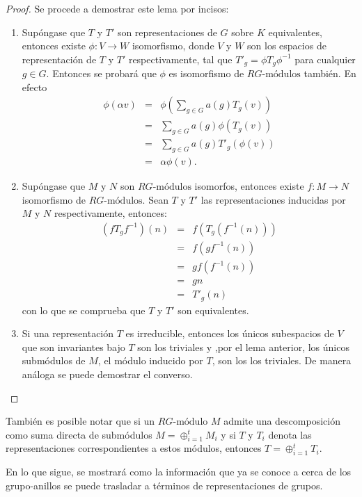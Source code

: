   \begin{proof}
  Se procede a demostrar este lema por incisos:
  \begin{enumerate}
  \item Supóngase que $T$ y $T'$ son representaciones de $G$ sobre $K$ equivalentes, entonces existe $\phi \colon V \to W$ isomorfismo, donde $V$ y $W$ son los espacios de representación de $T$ y $T'$ respectivamente, tal que $T'_g = \phi T_g \phi^{-1}$ para cualquier $g \in G$. Entonces se probará que $\phi$ es isomorfismo de $RG\mbox{-módulos}$ también.  En efecto
  \begin{eqnarray*}
   \phi(\alpha v) &=& \phi\left( \sum_{g \in G}a(g)T_g(v) \right) \\ 
   &=&  \sum_{g \in G}a(g)\phi(T_g(v)) \\
    & =& \sum_{g \in G}a(g)T'_g(\phi(v))\\ 
    &=& \alpha \phi(v).
  \end{eqnarray*}
   \item Supóngase que $M$ y $N$ son $RG\mbox{-módulos}$ isomorfos, entonces existe $f \colon M \to N$ isomorfismo de $RG\mbox{-módulos}$. Sean $T$ y $T'$ las representaciones inducidas por $M$ y $N$ respectivamente, entonces:
   \begin{eqnarray*}
   (fT_gf^{-1})(n) &=& 
    f\left(T_g\left(f^{-1}(n)\right)\right)\\
    &=& f\left(gf^{-1}(n)\right) \\
    &=& gf\left(f^{-1}(n)\right) \\
    &=& gn \\
    &=& T'_g(n)
   \end{eqnarray*} con lo que se comprueba que $T$ y $T'$ son equivalentes. 
   
   \item Si una representación $T$ es irreducible, entonces los únicos subespacios de $V$ que son invariantes bajo $T$ son los triviales y ,por el lema anterior, los únicos submódulos de $M$, el módulo inducido por $T$, son los los triviales. De manera análoga se puede demostrar el converso. \qedhere
   \end{enumerate}
  \end{proof}
  También es posible notar que si un $RG\mbox{-módulo}$ $M$ admite una descomposición como suma directa de submódulos $M = \oplus_{i = 1}^{t}M_i$ y si $T$ y $T_i$ denota las representaciones correspondientes a estos módulos, entonces $T = \oplus_{i = 1}^tT_i$. 
 
 En lo que sigue, se mostrará como la información que ya se conoce a cerca de los grupo-anillos se puede trasladar a términos de representaciones de grupos. 
 
